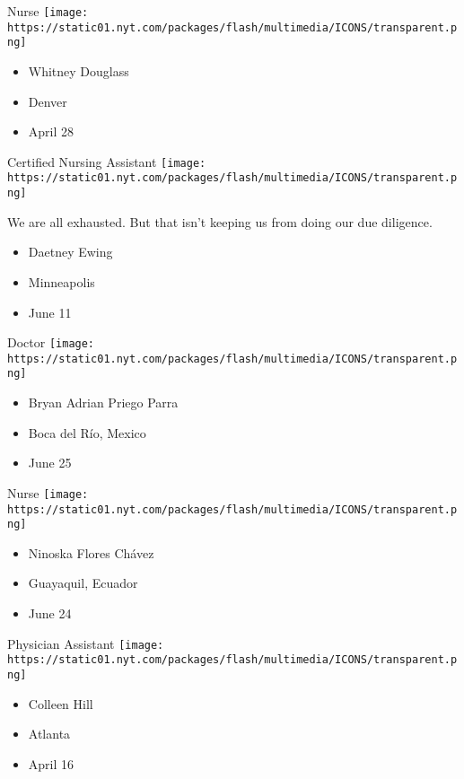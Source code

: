 Nurse
\texttt{[image: https://static01.nyt.com/packages/flash/multimedia/ICONS/transparent.png]}

\begin{itemize}
\tightlist
\item
  Whitney Douglass
\item
  Denver
\item
  April 28
\end{itemize}

\protect\hyperlink{item-daetney-ewing}{}

Certified Nursing Assistant
\texttt{[image: https://static01.nyt.com/packages/flash/multimedia/ICONS/transparent.png]}

We are all exhausted. But that isn't keeping us from doing our due
diligence.

\begin{itemize}
\tightlist
\item
  Daetney Ewing
\item
  Minneapolis
\item
  June 11
\end{itemize}

\protect\hyperlink{item-bryan-adrian-priego-parra}{}

Doctor
\texttt{[image: https://static01.nyt.com/packages/flash/multimedia/ICONS/transparent.png]}

\begin{itemize}
\tightlist
\item
  Bryan Adrian Priego Parra
\item
  Boca del Río, Mexico
\item
  June 25
\end{itemize}

\protect\hyperlink{item-ninoska-flores-chavez}{}

Nurse
\texttt{[image: https://static01.nyt.com/packages/flash/multimedia/ICONS/transparent.png]}

\begin{itemize}
\tightlist
\item
  Ninoska Flores Chávez 
\item
  Guayaquil, Ecuador
\item
  June 24
\end{itemize}

\protect\hyperlink{item-colleen-hill}{}

Physician Assistant
\texttt{[image: https://static01.nyt.com/packages/flash/multimedia/ICONS/transparent.png]}

\begin{itemize}
\tightlist
\item
  Colleen Hill
\item
  Atlanta
\item
  April 16
\end{itemize}

